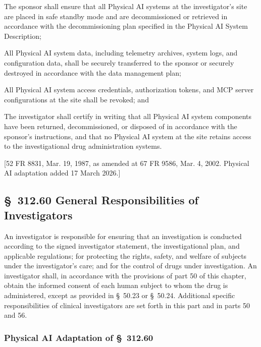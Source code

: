\begin{description}[leftmargin=0.8cm,style=sameline]
\item[(a)] The sponsor shall ensure that all Physical AI systems at the investigator's site are placed in safe standby mode and are decommissioned or retrieved in accordance with the decommissioning plan specified in the Physical AI System Description;
\item[(b)] All Physical AI system data, including telemetry archives, system logs, and configuration data, shall be securely transferred to the sponsor or securely destroyed in accordance with the data management plan;
\item[(c)] All Physical AI system access credentials, authorization tokens, and MCP server configurations at the site shall be revoked; and
\item[(d)] The investigator shall certify in writing that all Physical AI system components have been returned, decommissioned, or disposed of in accordance with the sponsor's instructions, and that no Physical AI system at the site retains access to the investigational drug administration systems.
\end{description}

[52 FR 8831, Mar. 19, 1987, as amended at 67 FR 9586, Mar. 4, 2002. Physical AI adaptation added 17 March 2026.]

\subsection{\S~312.60 General Responsibilities of Investigators}

An investigator is responsible for ensuring that an investigation is conducted according to the signed investigator statement, the investigational plan, and applicable regulations; for protecting the rights, safety, and welfare of subjects under the investigator's care; and for the control of drugs under investigation. An investigator shall, in accordance with the provisions of part 50 of this chapter, obtain the informed consent of each human subject to whom the drug is administered, except as provided in \S~50.23 or \S~50.24. Additional specific responsibilities of clinical investigators are set forth in this part and in parts 50 and 56.

\subsubsection{Physical AI Adaptation of \S~312.60}


